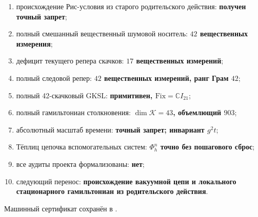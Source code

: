 \begin{protocol}
\begin{enumerate}
{       условно выбрана};
 \item происхождение Рис-условия из старого родительского действия:
       \textbf{получен точный запрет};
 \item полный смешанный вещественный шумовой носитель: \textbf{$42$ вещественных измерения};
 \item дефицит текущего репера скачков: \textbf{$17$ вещественных измерений};
 \item полный следовой репер: \textbf{$42$ вещественных измерений, ранг Грам $42$};
 \item полный 42-скачковый GKSL: \textbf{примитивен, $\mathrm{Fix}=\mathbb CI_{21}$};
 \item полный гамильтониан столкновения: \textbf{$\dim\mathcal K=43$, объемлющий $903$};
 \item абсолютный масштаб времени: \textbf{точный запрет; инвариант $g^2t$};
 \item Тёплиц цепочка вспомогательных систем: \textbf{$\Phi_h^n$ точно без пошагового сброс};
 \item все аудиты проекта формализованы: \textbf{нет};
 \item следующий перенос: \textbf{происхождение вакуумной цепи и локального
       стационарного гамильтониан из родительского действия}.
\end{enumerate}
\end{protocol}

Машинный сертификат сохранён в
.